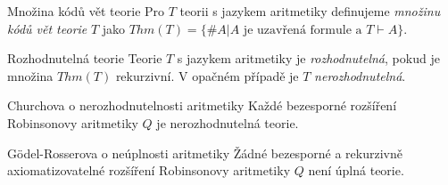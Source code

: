 \begin{definiceN}{Množina kódů vět teorie}
Pro $T$ teorii s jazykem aritmetiky definujeme \emph{množinu kódů vět teorie} $T$ jako $Thm(T)=\{\#A|A \text{ je uzavřená formule a } T\vdash A\}$.
\end{definiceN}

\begin{definiceN}{Rozhodnutelná teorie}
Teorie $T$ s jazykem aritmetiky je \emph{rozhodnutelná}, pokud je množina $Thm(T)$ rekurzivní. V opačném případě je $T$ \emph{nerozhodnutelná}.
\end{definiceN}


\begin{vetaN}{Churchova o nerozhodnutelnosti aritmetiky}
Každé bezesporné rozšíření Robinsonovy aritmetiky $Q$ je nerozhodnutelná teorie.
\end{vetaN}

\begin{vetaN}{Gödel-Rosserova o neúplnosti aritmetiky}
Žádné bezesporné a rekurzivně axiomatizovatelné rozšíření Robinsonovy aritmetiky $Q$ není úplná teorie.
\end{vetaN}


